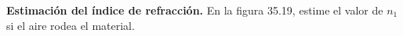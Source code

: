 \item \textbf{Estimación del índice de refracción.}
En la figura 35.19, estime el valor de $n_1$ si el aire rodea el material.